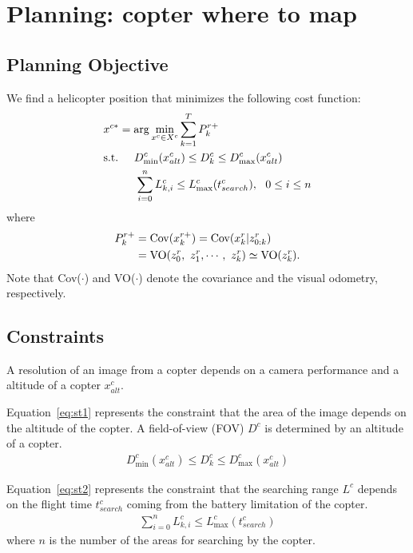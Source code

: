 \documentclass[conference]{IEEEtran}
\begin{document}
\section{Planning: copter where to map}
\subsection{Planning Objective}

We find a helicopter position that minimizes the following cost function:
\begin{align}
    &x^{c*}=\arg\min_{x^c \in X^c} \sum^T_{k=1} P^{r+}_k\label{eq:c1}\\
     &{\rm s.t.} \hspace{5mm} D^c_{\min}(x^c_{alt}) \leq D^c_k \leq D^c_{\max}(x^c_{alt})\label{eq:st1}\\
    &\hspace{10mm} \sum^{n}_{i=0} L^c_{k,i} \leq L^c_{\max}(t^c_{search}), ~~0\leq i \leq n \label{eq:st2}
\end{align}
where
\begin{align}
P^{r+}_k&={\rm Cov}(x^{r+}_k) = {\rm Cov}(x^{r}_k | z^r_{0:k})\label{eq:p1}\\
&={\rm VO}(z^r_0,~z^r_1,\cdots,~z^r_k)\simeq {\rm VO}(z^r_k).\label{eq:p2}
\end{align}
Note that Cov($\cdot$) and VO($\cdot$) denote the covariance and the visual odometry, respectively.

\subsection{Constraints}

A resolution of an image from a copter depends on a camera performance and a altitude of a copter $x^c_{alt}$.

Equation~\eqref{eq:st1} represents the constraint that the area of the image depends on the altitude of the copter.
A field-of-view (FOV) $D^c$ is determined by an altitude of a copter.
\begin{align}
    D^c_{\min}(x^c_{alt}) \leq D^c_k \leq D^c_{\max}(x^c_{alt})
\end{align}

Equation~\eqref{eq:st2} represents the constraint that the searching range $L^c$ depends on the flight time $t^c_{search}$ coming from the battery limitation of the copter.
\begin{align}
    \sum^{n}_{i=0} L^c_{k,i} \leq L^c_{\max}(t^c_{search})
\end{align}
where $n$ is the number of the areas for searching by the copter.
\end{document}
